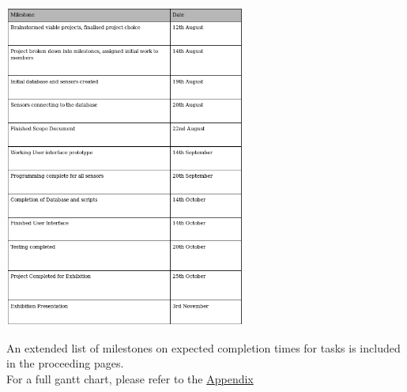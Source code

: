 \documentclass{article}
\begin{document}
        \begin{center}
            \includegraphics[width=300px]{Images/Milestones.jpg}
        \end{center}
        An extended list of milestones on expected completion times for tasks is included in the proceeding pages.
        \\
        For a full gantt chart, please refer to the \hyperref[sec:Appendix]{Appendix}
\end{document}
